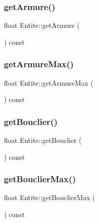 \subsubsection{\texorpdfstring{get\+Armure()}{getArmure()}}
{\footnotesize\ttfamily float Entite\+::get\+Armure (\begin{DoxyParamCaption}{ }\end{DoxyParamCaption}) const\hspace{0.3cm}{\ttfamily [inline]}}

\mbox{\label{class_entite_aa7c171ab62d923d8b6f2912851ac7b1d}} 
\subsubsection{\texorpdfstring{get\+Armure\+Max()}{getArmureMax()}}
{\footnotesize\ttfamily float Entite\+::get\+Armure\+Max (\begin{DoxyParamCaption}{ }\end{DoxyParamCaption}) const\hspace{0.3cm}{\ttfamily [inline]}}

\mbox{\label{class_entite_ae680682baaeab669956e9060fca74923}} 
\subsubsection{\texorpdfstring{get\+Bouclier()}{getBouclier()}}
{\footnotesize\ttfamily float Entite\+::get\+Bouclier (\begin{DoxyParamCaption}{ }\end{DoxyParamCaption}) const\hspace{0.3cm}{\ttfamily [inline]}}

\mbox{\label{class_entite_adecf490f77d783aa9492eb833b307939}} 
\subsubsection{\texorpdfstring{get\+Bouclier\+Max()}{getBouclierMax()}}
{\footnotesize\ttfamily float Entite\+::get\+Bouclier\+Max (\begin{DoxyParamCaption}{ }\end{DoxyParamCaption}) const\hspace{0.3cm}{\ttfamily [inline]}}

